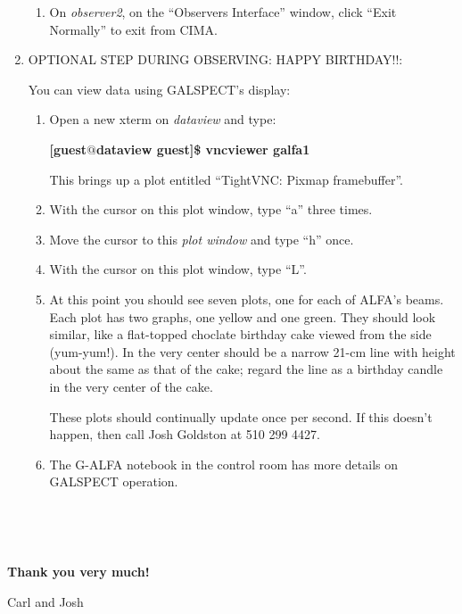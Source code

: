\begin{enumerate}
\begin{enumerate}
\item On {\it observer2}, on the ``Observers Interface'' window, click ``Exit
Normally'' to exit from CIMA. 

\end{enumerate}


\item OPTIONAL STEP DURING OBSERVING: HAPPY BIRTHDAY!!: 

	You can view data using GALSPECT's display: \begin{enumerate}

\item Open a new xterm on {\it dataview} and type:

{\bf [guest$@$dataview guest]\$ vncviewer galfa1} 

This brings up a plot entitled ``TightVNC: Pixmap framebuffer''.

\item With the cursor on this plot window, type ``a'' three times.

\item Move the cursor to this {\it plot window} and type ``h'' once.

\item With the cursor on this plot window, type ``L''.


\item At this point you should see seven plots, one for each of ALFA's
beams.  Each plot has two graphs, one yellow and one green.  They should
look similar, like a flat-topped choclate birthday cake viewed from the
side (yum-yum!).  In the very center should be a narrow 21-cm line with
height about the same as that of the cake; regard the line as a birthday
candle in the very center of the cake. 

	These plots should continually update once per second. If this
doesn't happen, then call Josh Goldston at 510 299 4427. 

\item The G-ALFA notebook in the control room has more details on GALSPECT
operation. 

\end{enumerate}\
\end{enumerate}\

{\bf Thank you very much!}

Carl and Josh







